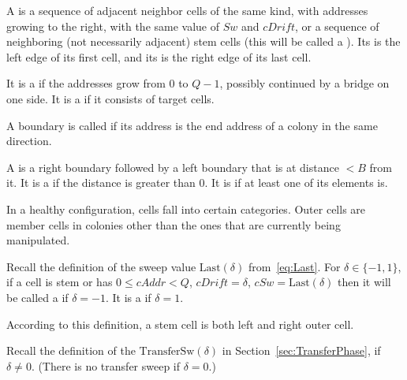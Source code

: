 \documentclass[12pt]{memoir}
\newcommand{\fld}[1]{\ensuremath{\textit{#1}}}
\def\B{B}
\newcommand{\cAddr}{\fld{cAddr}}
\newcommand{\cDrift}{\fld{cDrift}}
\newcommand{\Sweep}{\fld{Sw}}
\newcommand{\cSweep}{\fld{cSw}}
\newcommand{\Last}{\mathrm{Last}}
\newcommand{\TransferSw}{\mathrm{TransferSw}}
\begin{document}
\begin{definition}[Segments]\label{def:segments}
    A  is a sequence of adjacent neighbor cells of the same kind,
with addresses growing to the right, with the same value of \( \Sweep \)
and \( \cDrift \),
or a sequence of neighboring (not necessarily adjacent) 
stem cells (this will be called a ).
Its  is the left edge of its first cell, and its  is 
the right edge of its last cell.

It is a  if the addresses grow from \( 0 \) to \( Q-1 \), possibly continued
by a bridge on one side.
It is a %
 if it consists of target cells.

A boundary is called  if its address is the end 
address of a colony in the same direction.

A  
is a right boundary followed by a left boundary that is at distance \( <\B \) from it.
It is a  if the distance is greater than 0.
It is  if at least one of its elements is.
\end{definition}

In a healthy configuration, cells fall into certain categories.
Outer cells are member cells in colonies other than the ones that 
are currently being manipulated.

\begin{definition}\label{def:outer-cells}
    Recall the definition of the sweep value
    \(  \Last(\delta)  \) from~\eqref{eq:Last}.
    For \( \delta \in \{ -1,1 \} \), if a cell is stem or
    has \( 0 \le \cAddr < Q \),
    \( \cDrift = \delta \),
    \( \cSweep = \Last(\delta) \)
    then it will be called a  if
    \( \delta = -1 \).
    It is a  if \( \delta = 1 \).
\end{definition}

According to this definition, a stem cell is both left and right outer cell.

Recall the definition of the 
\( \TransferSw(\delta) \) in Section~\ref{sec:TransferPhase}, if \( \delta \ne 0 \).
(There is no transfer sweep if \( \delta = 0 \).)
\end{document}
